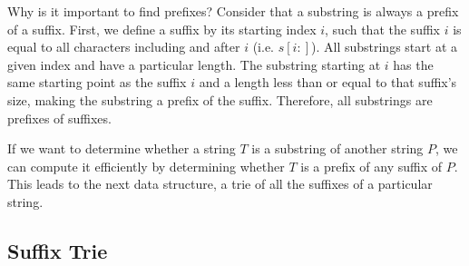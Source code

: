 \documentclass[11pt, oneside]{article}
\begin{document}
Why is it important to find prefixes? Consider that a substring is always a prefix of a suffix.
First, we define a suffix by its starting index \( i \), such that the suffix \( i \)
is equal to all characters including and after \( i \) (i.e. \( s[i:] \)).
All substrings start at a given index and have a particular length.
The substring starting at \( i \) has the same starting point as the suffix \( i \) and a length less than or equal to that suffix's size, making the substring a
prefix of the suffix.
Therefore, all substrings are prefixes of suffixes.

If we want to determine whether a string \( T \) is a substring of another string \( P \),
we can compute it efficiently by determining whether \( T \) is a prefix of any suffix of \( P \).
This leads to the next data structure, a trie of all the suffixes of a particular string.

\subsection{Suffix Trie}
\end{document}
